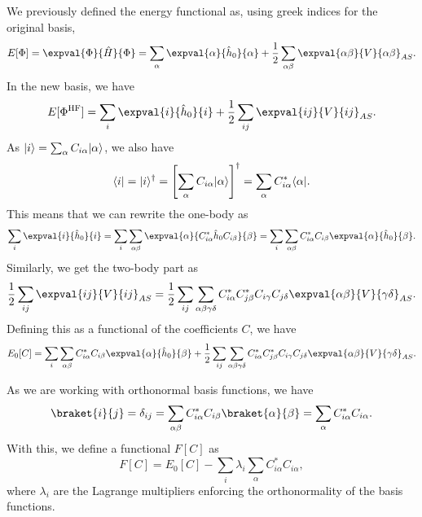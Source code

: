 \subsection{}
We previously defined the energy functional as, using greek indices for the original basis,
\begin{equation*}
    E[\Phi] = \expval{\Phi}{\hat{H}}{\Phi} = \sum_{\alpha} \expval{\alpha}{\hat{h}_0}{\alpha} + \frac{1}{2} \sum_{\alpha\beta} \expval{\alpha\beta}{V}{\alpha \beta}_{AS}.
\end{equation*}
In the new basis, we have
\begin{equation*}
    E[\Phi^\HF] = \sum_{i} \expval{i}{\hat{h}_0}{i} + \frac{1}{2} \sum_{ij} \expval{ij}{V}{ij}_{AS}.
\end{equation*}
As $\lvert i\rangle = \sum_{\alpha} C_{i \alpha} \lvert\alpha\rangle$, we also have
\begin{equation*}
    \langle i\rvert = \lvert i\rangle^\dagger
    = \left[ \sum_{\alpha} C_{i \alpha} \lvert\alpha\rangle \right]^\dagger
    = \sum_{\alpha} C_{i \alpha}^* \langle\alpha\rvert.
\end{equation*}
This means that we can rewrite the one-body as
\begin{align*}
    \sum_i \expval{i}{\hat{h}_0}{i} = \sum_{i} \sum_{\alpha\beta} \expval{\alpha}{C_{i \alpha}^* \hat{h}_0 C_{i \beta}}{\beta} = \sum_{i} \sum_{\alpha\beta} C_{i \alpha}^* C_{i \beta}  \expval{\alpha}{\hat{h}_0}{\beta}.
\end{align*}
Similarly, we get the two-body part as
\begin{equation*}
    \frac{1}{2} \sum_{ij} \expval{ij}{V}{ij}_{AS} = \frac{1}{2} \sum_{ij} \sum_{\alpha\beta\gamma\delta} C_{i \alpha}^* C_{j \beta}^* C_{i \gamma} C_{j \delta} \expval{\alpha\beta}{V}{\gamma\delta}_{AS}.
\end{equation*}
Defining this as a functional of the coefficients $C$, we have
\begin{equation}\label{eq:E0}
    E_0[C] = \sum_{i} \sum_{\alpha\beta} C_{i \alpha}^* C_{i \beta}  \expval{\alpha}{\hat{h}_0}{\beta} + \frac{1}{2} \sum_{ij} \sum_{\alpha\beta\gamma\delta} C_{i \alpha}^* C_{j \beta}^* C_{i \gamma} C_{j \delta} \expval{\alpha\beta}{V}{\gamma\delta}_{AS}.
\end{equation}

As we are working with orthonormal basis functions, we have
\begin{equation*}
    \braket{i}{j} = \delta_{ij} = \sum_{\alpha\beta} C_{i \alpha}^* C_{i \beta} \braket{\alpha}{\beta} = \sum_{\alpha} C_{i \alpha}^* C_{i \alpha}.
\end{equation*}
With this, we define a functional $F[C]$ as
\begin{equation*}
    F[C] = E_0[C] - \sum_{i} \lambda_i \sum_{\alpha} C_{i \alpha}^* C_{i \alpha},
\end{equation*}
where $\lambda_i$ are the Lagrange multipliers enforcing the orthonormality of the basis functions.

